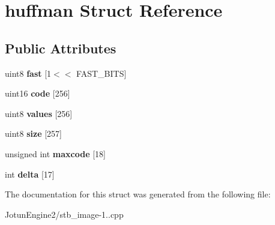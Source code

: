 \hypertarget{structhuffman}{\section{huffman Struct Reference}
\label{structhuffman}
}
\subsection*{Public Attributes}
\begin{DoxyCompactItemize}
\item 
\hypertarget{structhuffman_a9dbb29a8ed724a32f502d9595510ddc2}{uint8 {\bfseries fast} \mbox{[}1$<$$<$ F\-A\-S\-T\-\_\-\-B\-I\-T\-S\mbox{]}}\label{structhuffman_a9dbb29a8ed724a32f502d9595510ddc2}

\item 
\hypertarget{structhuffman_a9925018a95d5a2122cd732561fa0fa64}{uint16 {\bfseries code} \mbox{[}256\mbox{]}}\label{structhuffman_a9925018a95d5a2122cd732561fa0fa64}

\item 
\hypertarget{structhuffman_a313d78cf23f40b314c25681ff2a6224b}{uint8 {\bfseries values} \mbox{[}256\mbox{]}}\label{structhuffman_a313d78cf23f40b314c25681ff2a6224b}

\item 
\hypertarget{structhuffman_afdb0fbcf25aec42ba30b0d0e2453a057}{uint8 {\bfseries size} \mbox{[}257\mbox{]}}\label{structhuffman_afdb0fbcf25aec42ba30b0d0e2453a057}

\item 
\hypertarget{structhuffman_aeb78aca6c7377faaad8123566d54fc98}{unsigned int {\bfseries maxcode} \mbox{[}18\mbox{]}}\label{structhuffman_aeb78aca6c7377faaad8123566d54fc98}

\item 
\hypertarget{structhuffman_a04255e3e1c6de74d36a08a1aa4e9537d}{int {\bfseries delta} \mbox{[}17\mbox{]}}\label{structhuffman_a04255e3e1c6de74d36a08a1aa4e9537d}

\end{DoxyCompactItemize}


The documentation for this struct was generated from the following file\-:\begin{DoxyCompactItemize}
\item 
Jotun\-Engine2/stb\-\_\-image-\/1..\-cpp\end{DoxyCompactItemize}
